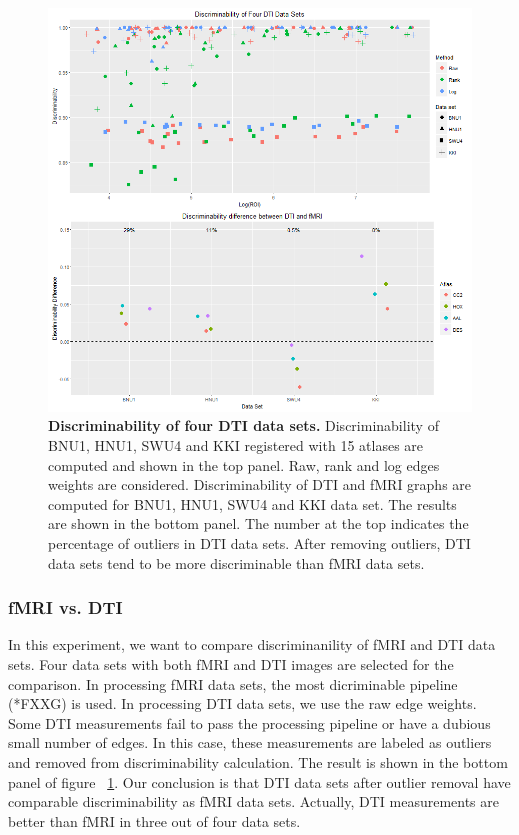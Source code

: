 \documentclass{article}
\begin{document}
\begin{figure}[ht!]
	\includegraphics[width=\linewidth]{../Figs/comb_dti.png}
	\caption{{ \bf Discriminability of four DTI data sets.} Discriminability of BNU1, HNU1, SWU4 and KKI registered with 15 atlases are computed and shown in the top panel. Raw, rank and log edges weights are considered. Discriminability of DTI and fMRI graphs are computed for BNU1, HNU1, SWU4 and KKI data set. The results are shown in the bottom panel. The number at the top indicates the percentage of outliers in DTI data sets. After removing outliers, DTI data sets tend to be more discriminable than fMRI data sets.}
	\label{fig:comb_dti}
\end{figure}

\subsubsection{fMRI vs. DTI}
In this experiment, we want to compare discriminanility of fMRI and DTI data sets. Four data sets with both fMRI and DTI images are selected for the comparison. In processing fMRI data sets, the most dicriminable pipeline (*FXXG) is used. In processing DTI data sets, we use the raw edge weights. Some DTI measurements fail to pass the processing pipeline or have a dubious small number of edges. In this case, these measurements are labeled as outliers and removed from discriminability calculation. The result is shown in the bottom panel of figure ~\ref{fig:comb_dti}. Our conclusion is that DTI data sets after outlier removal have comparable discriminability as fMRI data sets. Actually, DTI measurements are better than fMRI in three out of four data sets. 
\end{document}
